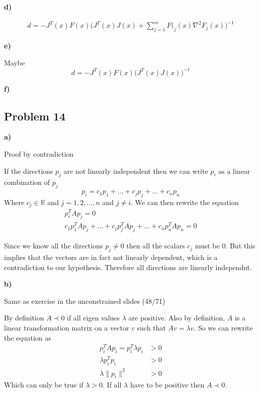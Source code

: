 \color{black}

\textbf{d)}

\answer

\begin{align*}
	d = - J^T(x) F(x) \Big( J^T(x) J(x) + \sum_{j=1}^m F(_j(x) \nabla^2 F_j(x)\Big)^{-1}
\end{align*}

\textbf{e)}

\answer

Maybe
\[
	d = - J^T(x) F(x) \Big( J^T(x) J(x))^{-1}
\]

\incomplete

\textbf{f)}

\incomplete

\subsection{Problem 14}

\textbf{a)}

\answer

Proof by contradiction

If the directions $p_j$ are not linearly independent then we can write $p_i$ as a linear combination of $p_j$
\[
	p_i = c_1 p_1 + \ldots + c_jp_j + \ldots + c_np_n
\]
Where $c_j \in \mathbb{R}$ and $j = {1, 2, \ldots, n}$ and $j \neq i$. We can then rewrite the equation
\begin{align*}
	p_i^T A p_j = 0 \\
	c_1p_1^TAp_j + \ldots + c_jp_j^TAp_j + \ldots + c_np_n^TAp_n = 0
\end{align*}

Since we know all the directions $p_j \neq 0$ then all the scalars $c_j$ must be 0. But this implies that the vectors are in fact not linearly dependent, which is a contradiction to our hypothesis. Therefore all directions are linearly independnt.

\textbf{b)}

\answer

Same as exercise in the unconstrained slides (48/71)

By definition $A \prec 0$ if all eigen values $\lambda$ are positive. Also by definition, $A$ is a linear transformation matrix on a vector $v$ such that $Av = \lambda v$. So we can rewrite the equation as
\begin{align*}
	p_i^TAp_i = p_i^T \lambda p_i &> 0 \\
	\lambda p_i^T p_i &> 0 \\
	\lambda \| p_i \|^2 &> 0
\end{align*}
Which can only be true if $\lambda > 0$. If all $\lambda$ have to be positive then $A \prec 0$.

